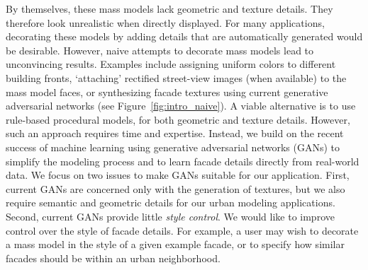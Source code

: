 By themselves, these mass models lack geometric and texture details. They therefore look unrealistic when directly displayed.
For many applications, decorating these models by adding details that are automatically generated would be desirable. However, naive attempts to decorate mass models lead to unconvincing results. Examples include assigning uniform colors to different building fronts, `attaching' rectified street-view images (when available) to the mass model faces, or synthesizing facade textures using current generative adversarial networks (see Figure~\ref{fig:intro_naive}). A viable alternative is to use  rule-based procedural models, for both geometric and texture details. However, such an approach requires time and expertise. 
%
Instead, we build on the recent success of machine learning using generative adversarial networks (GANs) to simplify the modeling process and to learn facade details directly from real-world data. We focus on two issues 
to make GANs suitable for our application.
First, current GANs are concerned only with the generation of textures, but we also require
semantic and geometric details
for our urban modeling applications.
Second, current GANs provide little \textit{style control}. We would like to improve control over the style of facade details. For example, a user may wish to decorate a mass model in the style of a given example facade, or to specify how similar facades should be within an urban neighborhood. %


